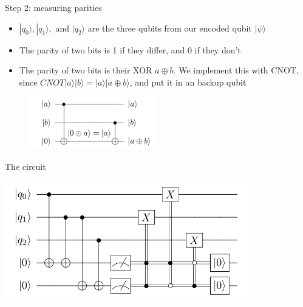 \documentclass[aspectratio=169, handout]{beamer}
\begin{document}
\begin{frame}{Step 2: measuring parities}
\begin{itemize}
    \item $|q_0\rangle, |q_1\rangle, \text{ and }|q_2\rangle$ are the three qubits from our encoded qubit $|\psi\rangle$ \pause
    \item The parity of two bits is 1 if they differ, and 0 if they don't \pause
    \item The parity of two bits is their XOR $a \oplus b.$ We implement this with CNOT, since $CNOT|a\rangle |b\rangle = |a\rangle |a \oplus b\rangle$, and put it in an backup qubit \pause
\end{itemize}
\begin{figure}
    \centering
    \includegraphics[width=0.5\textwidth]{sciusdknwdkn 2023-10-09 20_18_53.png}
\end{figure}
\end{frame}

\begin{frame}{The circuit}
\begin{center}
    \includegraphics[width=0.8\textwidth]{bitflipcode.png}\nocite{site:xkcd}
\end{center}
\end{frame}
\end{document}
